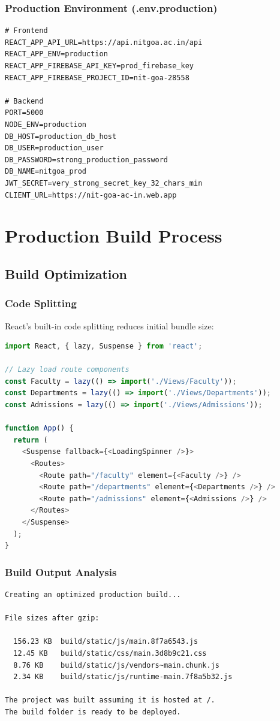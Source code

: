 \documentclass[12pt,a4paper]{report}
\begin{document}
\subsubsection*{Production Environment (.env.production)}
\begin{lstlisting}[caption=Production Environment Variables]
# Frontend
REACT_APP_API_URL=https://api.nitgoa.ac.in/api
REACT_APP_ENV=production
REACT_APP_FIREBASE_API_KEY=prod_firebase_key
REACT_APP_FIREBASE_PROJECT_ID=nit-goa-28558

# Backend
PORT=5000
NODE_ENV=production
DB_HOST=production_db_host
DB_USER=production_user
DB_PASSWORD=strong_production_password
DB_NAME=nitgoa_prod
JWT_SECRET=very_strong_secret_key_32_chars_min
CLIENT_URL=https://nit-goa-ac-in.web.app
\end{lstlisting}

\section{Production Build Process}

\subsection{Build Optimization}

\subsubsection*{Code Splitting}
React's built-in code splitting reduces initial bundle size:
\begin{lstlisting}[language=JavaScript, caption=Lazy Loading Components]
import React, { lazy, Suspense } from 'react';

// Lazy load route components
const Faculty = lazy(() => import('./Views/Faculty'));
const Departments = lazy(() => import('./Views/Departments'));
const Admissions = lazy(() => import('./Views/Admissions'));

function App() {
  return (
    <Suspense fallback={<LoadingSpinner />}>
      <Routes>
        <Route path="/faculty" element={<Faculty />} />
        <Route path="/departments" element={<Departments />} />
        <Route path="/admissions" element={<Admissions />} />
      </Routes>
    </Suspense>
  );
}
\end{lstlisting}

\subsubsection*{Build Output Analysis}
\begin{lstlisting}[caption=Typical Build Output]
Creating an optimized production build...

File sizes after gzip:

  156.23 KB  build/static/js/main.8f7a6543.js
  12.45 KB   build/static/css/main.3d8b9c21.css
  8.76 KB    build/static/js/vendors~main.chunk.js
  2.34 KB    build/static/js/runtime-main.7f8a5b32.js

The project was built assuming it is hosted at /.
The build folder is ready to be deployed.
\end{lstlisting}
\end{document}
